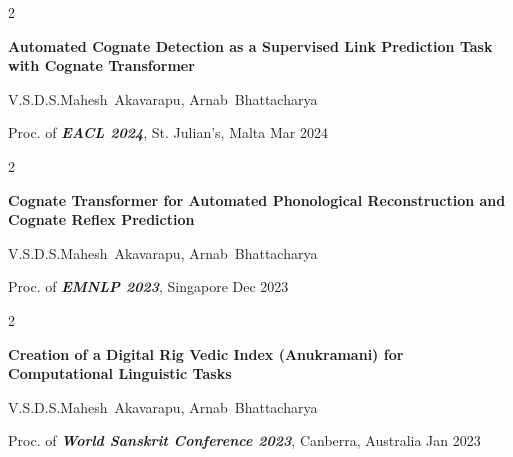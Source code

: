 \documentclass[12pt, letterpaper]{article}
\newenvironment{twocolentry}[2][]{
    \onecolentry
    \def\secondColumn{#2}
    \setcolumnwidth{\fill, 4.5 cm}
    \begin{paracol}{2}
}{
    \switchcolumn \raggedleft \secondColumn
    \end{paracol}
    \endonecolentry
} %
\begin{document}
        \vspace{0.2 cm}

        \begin{samepage}
            \begin{twocolentry}{
                Mar 2024
            }
                \textbf{Automated Cognate Detection as a Supervised Link Prediction Task with Cognate Transformer}

                \vspace{0.10 cm}

                \mbox{V.S.D.S.Mahesh Akavarapu}, \mbox{Arnab Bhattacharya}
                \vspace{0.10 cm}

        Proc. of \textbf{\textit{EACL 2024}}, St. Julian's, Malta    \end{twocolentry}
        \end{samepage}

        \vspace{0.2 cm}

        \begin{samepage}
            \begin{twocolentry}{
                Dec 2023
            }
                \textbf{Cognate Transformer for Automated Phonological Reconstruction and Cognate Reflex Prediction}

                \vspace{0.10 cm}

                \mbox{V.S.D.S.Mahesh Akavarapu}, \mbox{Arnab Bhattacharya}
                \vspace{0.10 cm}

        Proc. of \textbf{\textit{EMNLP 2023}}, Singapore    \end{twocolentry}
        \end{samepage}

        \vspace{0.2 cm}

        \begin{samepage}
            \begin{twocolentry}{
                Jan 2023
            }
                \textbf{Creation of a Digital Rig Vedic Index (Anukramani) for Computational Linguistic Tasks}

                \vspace{0.10 cm}

                \mbox{V.S.D.S.Mahesh Akavarapu}, \mbox{Arnab Bhattacharya}
                \vspace{0.10 cm}

        Proc. of \textbf{\textit{World Sanskrit Conference 2023}}, Canberra, Australia    \end{twocolentry}
        \end{samepage}
\end{document}
